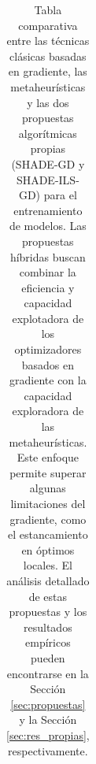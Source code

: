 \begin{table}[H]
{\begin{tabular}{|p{3cm}|p{4cm}|p{4cm}|p{4cm}|}
\end{tabular}%
}
\caption[Tabla comparativa entre las técnicas clásicas basadas en gradiente, las metaheurísticas y las dos propuestas algorítmicas propias (SHADE-GD y SHADE-ILS-GD)]{Tabla comparativa entre las técnicas clásicas basadas en gradiente, las metaheurísticas y las dos propuestas algorítmicas propias (SHADE-GD y SHADE-ILS-GD) para el entrenamiento de modelos. Las propuestas híbridas buscan combinar la eficiencia y capacidad explotadora de los optimizadores basados en gradiente con la capacidad exploradora de las metaheurísticas. Este enfoque permite superar algunas limitaciones del gradiente, como el estancamiento en óptimos locales. El análisis detallado de estas propuestas y los resultados empíricos pueden encontrarse en la Sección \ref{sec:propuestas} y la Sección \ref{sec:res_propias}, respectivamente.}
\label{tab:comp_propias}
\end{table}

